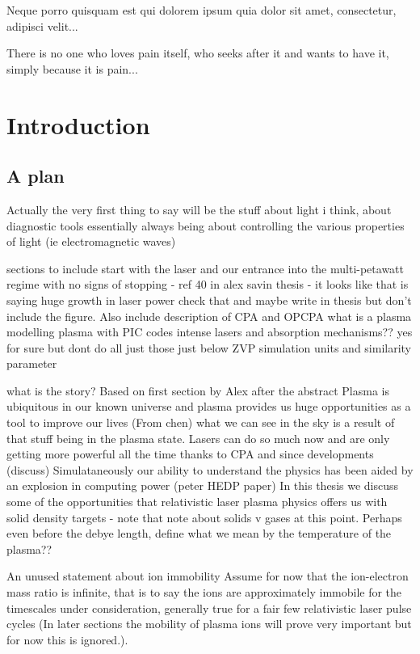\begin{savequote}[8cm]
\textlatin{Neque porro quisquam est qui dolorem ipsum quia dolor sit amet, consectetur, adipisci velit...}

There is no one who loves pain itself, who seeks after it and wants to have it, simply because it is pain...
\end{savequote}

\chapter{\label{ch:1-intro}Introduction} 

\minitoc

\section{A plan}
Actually the very first thing to say will be the stuff about light i think, about diagnostic tools essentially always being about controlling the various properties of light (ie electromagnetic waves)

sections to include
start with the laser and our entrance into the multi-petawatt regime with no signs of stopping - ref 40 in alex savin thesis - it looks like that is saying huge growth in laser power check that and maybe write in thesis but don't include the figure. Also include description of CPA and OPCPA
what is a plasma
modelling plasma with PIC codes
intense lasers and absorption mechanisms?? yes for sure but dont do all just those just below ZVP
simulation units and similarity parameter

what is the story? Based on first section by Alex after the abstract
Plasma is ubiquitous in our known universe and plasma provides us huge opportunities as a tool to improve our lives
(From chen) what we can see in the sky is a result of that stuff being in the plasma state.
Lasers can do so much now and are only getting more powerful all the time thanks to CPA and since developments (discuss)
Simulataneously our ability to understand the physics has been aided by an explosion in computing power (peter HEDP paper)
In this thesis we discuss some of the opportunities that relativistic laser plasma physics offers us with solid density targets - note that note about solids v gases at this point. 
Perhaps even before the debye length, define what we mean by the temperature of the plasma??

An unused statement about ion immobility
Assume for now that the ion-electron mass ratio is infinite, that is to say the ions are approximately immobile for the timescales under consideration, generally true for a fair few relativistic laser pulse cycles (In later sections the mobility of plasma ions will prove very important but for now this is ignored.).

